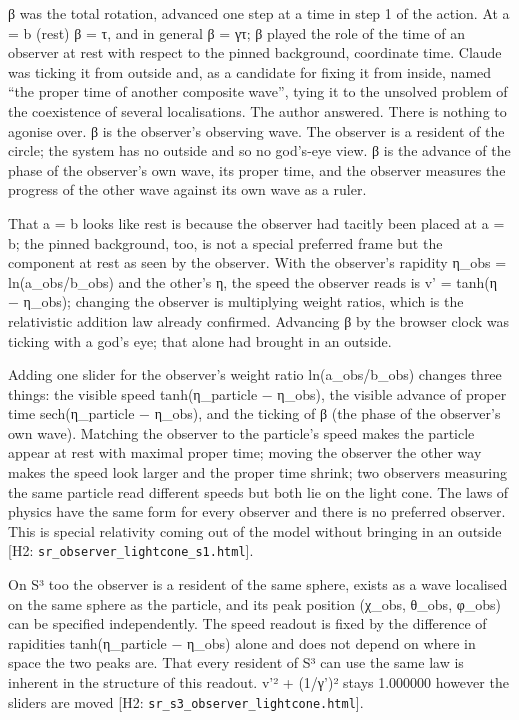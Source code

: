 \documentclass[
  a4paper,
]{article}
\begin{document}
β was the total rotation, advanced one step at a time in step 1 of the
action. At a = b (rest) β = τ, and in general β = γτ; β played the role
of the time of an observer at rest with respect to the pinned
background, coordinate time. Claude was ticking it from outside and, as
a candidate for fixing it from inside, named ``the proper time of
another composite wave'', tying it to the unsolved problem of the
coexistence of several localisations. The author answered. There is
nothing to agonise over. β is the observer's observing wave. The
observer is a resident of the circle; the system has no outside and so
no god's-eye view. β is the advance of the phase of the observer's own
wave, its proper time, and the observer measures the progress of the
other wave against its own wave as a ruler.

That a = b looks like rest is because the observer had tacitly been
placed at a = b; the pinned background, too, is not a special preferred
frame but the component at rest as seen by the observer. With the
observer's rapidity η\_obs = ln(a\_obs/b\_obs) and the other's η, the
speed the observer reads is v' = tanh(η − η\_obs); changing the observer
is multiplying weight ratios, which is the relativistic addition law
already confirmed. Advancing β by the browser clock was ticking with a
god's eye; that alone had brought in an outside.

Adding one slider for the observer's weight ratio ln(a\_obs/b\_obs)
changes three things: the visible speed tanh(η\_particle − η\_obs), the
visible advance of proper time sech(η\_particle − η\_obs), and the
ticking of β (the phase of the observer's own wave). Matching the
observer to the particle's speed makes the particle appear at rest with
maximal proper time; moving the observer the other way makes the speed
look larger and the proper time shrink; two observers measuring the same
particle read different speeds but both lie on the light cone. The laws
of physics have the same form for every observer and there is no
preferred observer. This is special relativity coming out of the model
without bringing in an outside {[}H2:
\texttt{sr\_\allowbreak{}observer\_\allowbreak{}lightcone\_\allowbreak{}s1.html}{]}.

On S³ too the observer is a resident of the same sphere, exists as a
wave localised on the same sphere as the particle, and its peak position
(χ\_obs, θ\_obs, φ\_obs) can be specified independently. The speed
readout is fixed by the difference of rapidities tanh(η\_particle −
η\_obs) alone and does not depend on where in space the two peaks are.
That every resident of S³ can use the same law is inherent in the
structure of this readout. v'² + (1/γ')² stays 1.000000 however the
sliders are moved {[}H2: \texttt{sr\_\allowbreak{}s3\_\allowbreak{}observer\_\allowbreak{}lightcone.html}{]}.
\end{document}
